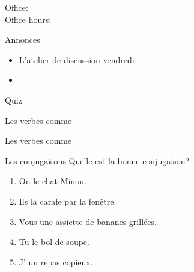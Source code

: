 \documentclass{beamer}
\subtitle[Repas et verbes (\lexi{acheter} et \lexi{appeler})]{Les repas et les verbes comme \lexi{acheter} et \lexi{appeler}}
\begin{document}
  \begin{frame}
    \titlepage
    \tiny{Office: \\
          Office hours: }
  \end{frame}

  \begin{frame}{Annonces}
    \begin{itemize}
      \item L'atelier de discussion vendredi
      \item[] 
    \end{itemize}
  \end{frame}

  \begin{frame}{}
    \begin{center}
      \Large Quiz
    \end{center}
  \end{frame}

  \begin{frame}{Les verbes comme }
    \begin{center}
      
    \end{center}
  \end{frame}

  \begin{frame}{Les verbes comme }
    \begin{center}
      
    \end{center}
  \end{frame}

  \begin{frame}{Les conjugaisons}
    Quelle est la bonne conjugaison? \\
    \begin{enumerate}
      \item On \underline{} le chat Minou.
      \item Ils \underline{} la carafe par la fenêtre.
      \item Vous \underline{} une assiette de bananes grillées.
      \item Tu \underline{} le bol de soupe.
      \item J'\underline{} un repas copieux.
    \end{enumerate}
  \end{frame}
\end{document}
